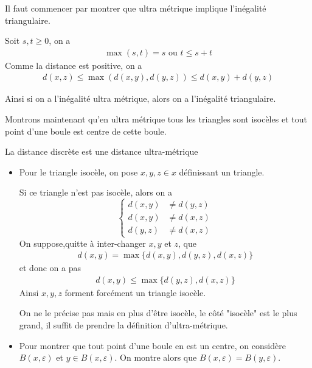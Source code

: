 \documentclass[french,a4paper,10pt]{article}
\begin{document}
	\begin{td-sol}
		Il faut commencer par montrer que ultra métrique implique l'inégalité triangulaire.
		
		Soit $s,t\ge 0$, on a
			\[\begin{aligned}
				\max(s,t)=s\text{ ou }t\le s+t
			\end{aligned}\]
		Comme la distance est positive, on a
			\[\begin{aligned}
				d(x,z)\le \max(d(x,y),d(y,z))\le d(x,y)+d(y,z)
			\end{aligned}\]
			
		Ainsi si on a l'inégalité ultra métrique, alors on a l'inégalité triangulaire.
		
		Montrons maintenant qu'en ultra métrique tous les triangles sont isocèles et tout point d'une boule est centre de cette boule.
		
		\begin{no-num-remark}
			La distance discrète est une distance ultra-métrique
		\end{no-num-remark}
		
		\begin{itemize}
			\item Pour le triangle isocèle, on pose $x,y,z\in x$ définissant un triangle.
			
			Si ce triangle n'est pas isocèle, alors on a
				\[\begin{cases}
					d(x,y)&\ne d(y,z)\\
					d(x,y)&\ne d(x,z)\\
					d(y,z)&\ne d(x,z)
				\end{cases}\]
			On suppose,quitte à inter-changer $x,y$ et $z$, que
			\[\begin{aligned}
				d(x,y)=\max\{d(x,y),d(y,z),d(x,z)\}
			\end{aligned}\]
			et donc on a pas
			\[\begin{aligned}
				d(x,y)\le \max\{d(y,z),d(x,z)\}
			\end{aligned}\]
			Ainsi $x,y,z$ forment forcément un triangle isocèle.
			\begin{no-num-remark}
				On ne le précise pas mais en plus d'être isocèle, le côté "isocèle" est le plus grand, il suffit de prendre la définition d'ultra-métrique.
			\end{no-num-remark}
			
			\item Pour montrer que tout point d'une boule en est un centre, on considère $B(x,\varepsilon)$ et $y\in B(x,\varepsilon)$. On montre alors que $B(x,\varepsilon)=B(y,\varepsilon)$.
			

\end{itemize}
\end{td-sol}
\end{document}
